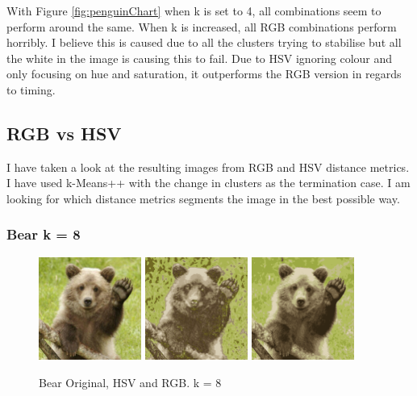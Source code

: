 \documentclass{article}
\begin{document}
With Figure \ref{fig:penguinChart} when k is set to 4, all combinations seem to
perform around the same. When k is increased, all RGB combinations perform
horribly. I believe this is caused due to all the clusters trying to stabilise
but all the white in the image is causing this to fail. Due to HSV ignoring
colour and only focusing on hue and saturation, it outperforms the RGB version
in regards to timing.

\subsection{RGB vs HSV}
I have taken a look at the resulting images from RGB and HSV distance metrics. I
have used k-Means++ with the change in clusters as the termination case. I am
looking for which distance metrics segments the image in the best possible way.

\subsubsection{Bear k = 8}

\begin{figure}[!ht]
\begin{center}
\includegraphics[width=0.3\textwidth]{images/bear}
\includegraphics[width=0.3\textwidth]{images/hsv_8_bear}
\includegraphics[width=0.3\textwidth]{images/rgb_8_bear}
\caption{Bear Original, HSV and RGB. k = 8}
\label{fig:bear}
\end{center}
\end{figure}
\end{document}
